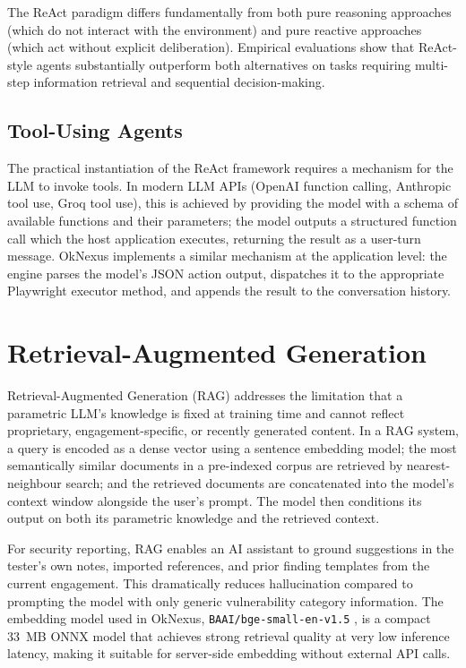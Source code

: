 The ReAct paradigm differs fundamentally from both pure reasoning approaches (which do not interact with the environment) and pure reactive approaches (which act without explicit deliberation). Empirical evaluations show that ReAct-style agents substantially outperform both alternatives on tasks requiring multi-step information retrieval and sequential decision-making.

\subsection{Tool-Using Agents}

The practical instantiation of the ReAct framework requires a mechanism for the LLM to invoke tools. In modern LLM APIs (OpenAI function calling, Anthropic tool use, Groq tool use), this is achieved by providing the model with a schema of available functions and their parameters; the model outputs a structured function call which the host application executes, returning the result as a user-turn message. OkNexus implements a similar mechanism at the application level: the engine parses the model's JSON action output, dispatches it to the appropriate Playwright executor method, and appends the result to the conversation history.

\section{Retrieval-Augmented Generation}

Retrieval-Augmented Generation (RAG) addresses the limitation that a parametric LLM's knowledge is fixed at training time and cannot reflect proprietary, engagement-specific, or recently generated content. In a RAG system, a query is encoded as a dense vector using a sentence embedding model; the most semantically similar documents in a pre-indexed corpus are retrieved by nearest-neighbour search; and the retrieved documents are concatenated into the model's context window alongside the user's prompt. The model then conditions its output on both its parametric knowledge and the retrieved context.

For security reporting, RAG enables an AI assistant to ground suggestions in the tester's own notes, imported references, and prior finding templates from the current engagement. This dramatically reduces hallucination compared to prompting the model with only generic vulnerability category information. The embedding model used in OkNexus, \texttt{BAAI/bge-small-en-v1.5} \cite{bge_small}, is a compact 33~MB ONNX model that achieves strong retrieval quality at very low inference latency, making it suitable for server-side embedding without external API calls.

